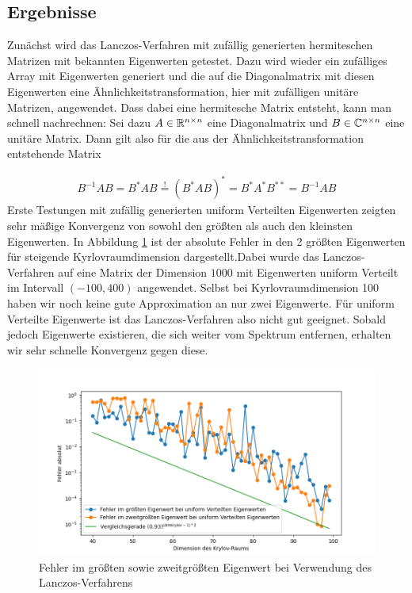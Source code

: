 \documentclass{article}
\begin{document}
\begin{theorem}
\subsection{Ergebnisse}

Zunächst wird das Lanczos-Verfahren mit zufällig generierten hermiteschen Matrizen mit bekannten Eigenwerten getestet. Dazu wird wieder ein zufälliges Array mit Eigenwerten generiert und die auf die Diagonalmatrix mit diesen Eigenwerten eine Ähnlichkeitstransformation, hier mit zufälligen unitäre Matrizen, angewendet. Dass dabei eine hermitesche Matrix entsteht, kann man schnell nachrechnen: Sei dazu $A \in \mathbb{R}^{n\times n}$ eine Diagonalmatrix und $B \in \mathbb{C}^{n\times n}$ eine unitäre Matrix. Dann gilt also für die aus der Ähnlichkeitstransformation entstehende Matrix

\begin{align*}
	B^{-1}AB
	=
	B^* A B
	\stackrel{!}{=}
	(B^* A B)^*
	=
	B^* A^* B^{**}
	=
	B^{-1} A B
\end{align*}
Erste Testungen mit zufällig generierten uniform Verteilten Eigenwerten zeigten sehr mäßige Konvergenz von sowohl den größten als auch den kleinsten Eigenwerten. In Abbildung \ref{error_uniform} ist der absolute Fehler in den 2 größten Eigenwerten für steigende Kyrlovraumdimension dargestellt.Dabei wurde das Lanczos-Verfahren auf eine Matrix der Dimension $1000$ mit Eigenwerten uniform Verteilt im Intervall $(-100,400)$ angewendet. Selbst bei Kyrlovraumdimension 100 haben wir noch keine gute Approximation an nur zwei Eigenwerte. Für uniform Verteilte Eigenwerte ist das Lanczos-Verfahren also nicht gut geeignet. Sobald jedoch Eigenwerte existieren, die sich weiter vom Spektrum entfernen, erhalten wir sehr schnelle Konvergenz gegen diese.

\begin{figure}[H]\label{error_uniform}
\begin{center}

	\includegraphics[width = 0.6 \linewidth]{Plots/error_uniform}
	\caption{Fehler im größten sowie zweitgrößten Eigenwert bei Verwendung des Lanczos-Verfahrens}
	\end{center}
\end{figure}


\end{theorem}
\end{document}
